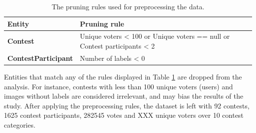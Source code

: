     \begin {table}[]
        \centering
        \begin{tabular}{l|l}
            \textbf{Entity}              & \textbf{Pruning rule} \\
            \hline
            \textbf{Contest}             & Unique voters < 100 or Unique voters == null or Contest participants < 2 \\
            \textbf{ContestParticipant}  & Number of labels < 0 
        \end{tabular}
        \caption{The pruning rules used for preprocessing the data.}
        \label{preprocessing_rules}
    \end{table}

    Entities that match any of the rules displayed in Table \ref{preprocessing_rules} are dropped from the analysis. For instance, contests with less than 100 unique voters (users) and images without labels are considered irrelevant, and may bias the results of the study. After applying the preprocessing rules, the dataset is left with 92 contests, 1625 contest participants, 282545 votes and XXX unique voters over 10 contest categories. %


